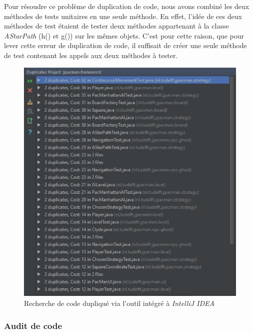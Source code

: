 \documentclass[12pt, openany]{report}
\begin{document}
Pour résoudre ce problème de duplication de code, nous avons combiné les deux méthodes de tests unitaires en une seule méthode. En effet, l'idée de ces deux méthodes de test étaient de tester deux méthodes appartenant à la classe \mbox{\textit{AStarPath}} (h() et g()) sur les mêmes objets. C'est pour cette raison, que pour lever cette erreur de duplication de code, il suffisait de créer une seule méthode de test contenant les appels aux deux méthodes à tester.
\begin{figure}[h]
	\centering
	\includegraphics{Images/duplicate_analysis.JPG}
	\caption{\label{duplicate} Recherche de code dupliqué via l'outil intégré à \textit{IntelliJ IDEA}}
\end{figure}

\subsubsection{Audit de code}
\end{document}
